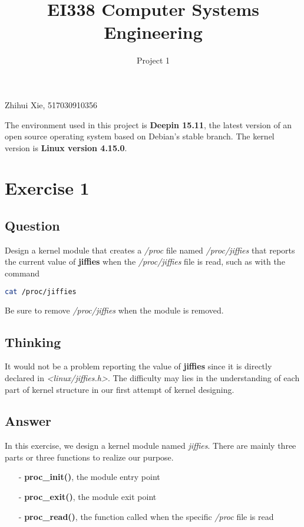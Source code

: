 \documentclass{article}
\title{EI338 Computer Systems Engineering}
\author{Project 1}
\begin{document}
\maketitle

\begin{center}
    Zhihui Xie, 517030910356
\end{center}

The environment used in this project is \textbf{Deepin 15.11}, the latest version of an open source operating system based on Debian's stable branch. The kernel version is \textbf{Linux version 4.15.0}.

\section*{Exercise 1}
    \subsection*{Question}
    Design a kernel module that creates a \textit{/proc} file named \textit{/proc/jiffies}
    that reports the current value of \textbf{jiffies} when the \textit{/proc/jiffies} file
    is read, such as with the command

    \vspace{2pt}

    \begin{lstlisting}[language=bash]
cat /proc/jiffies
    \end{lstlisting}

    \vspace{2pt}

    Be sure to remove \textit{/proc/jiffies} when the module is removed.
        
    \subsection*{Thinking} It would not be a problem reporting the value of \textbf{jiffies} since it is directly declared in \textit{<linux/jiffies.h>}. The difficulty may lies in the understanding of each part of kernel structure in our first attempt of kernel designing. 
    
    \subsection*{Answer} In this exercise, we design a kernel module named \textit{jiffies}. There are mainly three parts or three functions to realize our purpose.
    \begin{enumerate}
        \item[-] \textbf{proc\_init()}, the module entry point 
        \item[-] \textbf{proc\_exit()}, the module exit point
        \item[-] \textbf{proc\_read()}, the function called when the specific \textit{/proc} file is read  
    \end{enumerate}
\end{document}
